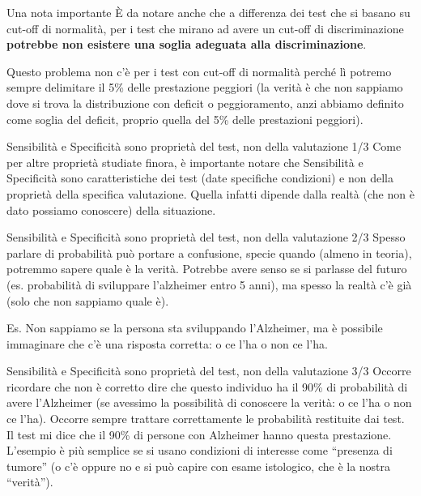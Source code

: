 \documentclass[
  ignorenonframetext,
  aspectratio=169,
]{beamer}
\begin{document}
\begin{frame}{Una nota importante}
\label{una-nota-importante}
È da notare anche che a differenza dei test che si basano su cut-off di
normalità, per i test che mirano ad avere un cut-off di discriminazione
\textbf{potrebbe non esistere una soglia adeguata alla discriminazione}.

Questo problema non c'è per i test con cut-off di normalità perché lì
potremo sempre delimitare il 5\% delle prestazione peggiori (la verità è
che non sappiamo dove si trova la distribuzione con deficit o
peggioramento, anzi abbiamo definito come soglia del deficit, proprio
quella del 5\% delle prestazioni peggiori).
\end{frame}

\begin{frame}{\small Sensibilità e Specificità sono proprietà del test,
non della valutazione 1/3}
\label{sensibilituxe0-e-specificituxe0-sono-proprietuxe0-del-test-non-della-valutazione-13}
Come per altre proprietà studiate finora, è importante notare che
Sensibilità e Specificità sono caratteristiche dei test (date specifiche
condizioni) e non della proprietà della specifica valutazione. Quella
infatti dipende dalla realtà (che non è dato possiamo conoscere) della
situazione.
\end{frame}

\begin{frame}{\small Sensibilità e Specificità sono proprietà del test,
non della valutazione 2/3}
\label{sensibilituxe0-e-specificituxe0-sono-proprietuxe0-del-test-non-della-valutazione-23}
Spesso parlare di probabilità può portare a confusione, specie quando
(almeno in teoria), potremmo sapere quale è la verità. Potrebbe avere
senso se si parlasse del futuro (es. probabilità di sviluppare
l'alzheimer entro 5 anni), ma spesso la realtà c'è già (solo che non
sappiamo quale è).

Es. Non sappiamo se la persona sta sviluppando l'Alzheimer, ma è
possibile immaginare che c'è una risposta corretta: o ce l'ha o non ce
l'ha.
\end{frame}

\begin{frame}{\small Sensibilità e Specificità sono proprietà del test,
non della valutazione 3/3}
\label{sensibilituxe0-e-specificituxe0-sono-proprietuxe0-del-test-non-della-valutazione-33}
Occorre ricordare che non è corretto dire che questo individuo ha il
90\% di probabilità di avere l'Alzheimer (se avessimo la possibilità di
conoscere la verità: o ce l'ha o non ce l'ha). Occorre sempre trattare
correttamente le probabilità restituite dai test. Il test mi dice che il
90\% di persone con Alzheimer hanno questa prestazione. L'esempio è più
semplice se si usano condizioni di interesse come ``presenza di tumore''
(o c'è oppure no e si può capire con esame istologico, che è la nostra
``verità'').
\end{frame}
\end{document}
